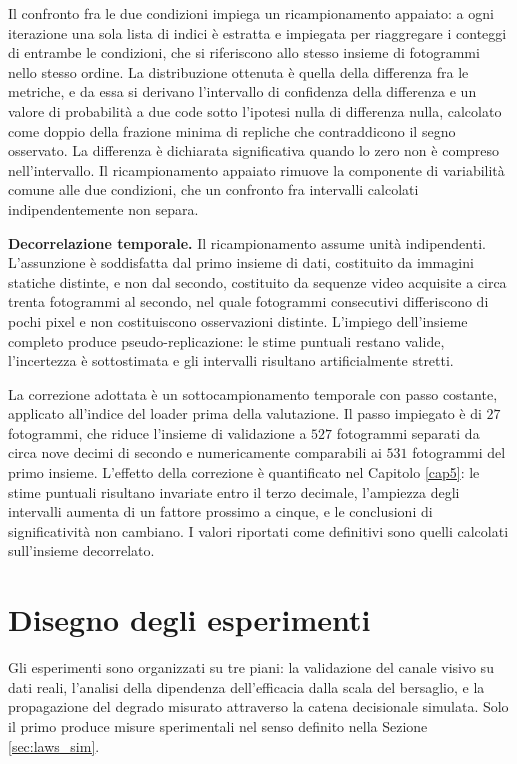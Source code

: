 \documentclass[a4paper,12pt]{report}
\begin{document}
Il confronto fra le due condizioni impiega un ricampionamento appaiato: a ogni
iterazione una sola lista di indici è estratta e impiegata per riaggregare i
conteggi di entrambe le condizioni, che si riferiscono allo stesso insieme di
fotogrammi nello stesso ordine. La distribuzione ottenuta è quella della
differenza fra le metriche, e da essa si derivano l'intervallo di confidenza
della differenza e un valore di probabilità a due code sotto l'ipotesi nulla di
differenza nulla, calcolato come doppio della frazione minima di repliche che
contraddicono il segno osservato. La differenza è dichiarata significativa
quando lo zero non è compreso nell'intervallo. Il ricampionamento appaiato
rimuove la componente di variabilità comune alle due condizioni, che un
confronto fra intervalli calcolati indipendentemente non separa.

\textbf{Decorrelazione temporale.}
\label{sec:decorrelazione}
Il ricampionamento assume unità indipendenti. L'assunzione è soddisfatta dal
primo insieme di dati, costituito da immagini statiche distinte, e non dal
secondo, costituito da sequenze video acquisite a circa trenta fotogrammi al
secondo, nel quale fotogrammi consecutivi differiscono di pochi pixel e non
costituiscono osservazioni distinte. L'impiego dell'insieme completo produce
pseudo-replicazione: le stime puntuali restano valide, l'incertezza è
sottostimata e gli intervalli risultano artificialmente stretti.

La correzione adottata è un sottocampionamento temporale con passo costante,
applicato all'indice del loader prima della valutazione. Il passo impiegato è di
$27$ fotogrammi, che riduce l'insieme di validazione a $527$ fotogrammi separati
da circa nove decimi di secondo e numericamente comparabili ai $531$ fotogrammi
del primo insieme. L'effetto della correzione è quantificato nel Capitolo
\ref{cap5}: le stime puntuali risultano invariate entro il terzo decimale,
l'ampiezza degli intervalli aumenta di un fattore prossimo a cinque, e le
conclusioni di significatività non cambiano. I valori riportati come definitivi
sono quelli calcolati sull'insieme decorrelato.

\section{Disegno degli esperimenti}
\label{sec:esperimenti}

Gli esperimenti sono organizzati su tre piani: la validazione del canale visivo
su dati reali, l'analisi della dipendenza dell'efficacia dalla scala del
bersaglio, e la propagazione del degrado misurato attraverso la catena
decisionale simulata. Solo il primo produce misure sperimentali nel senso
definito nella Sezione \ref{sec:laws_sim}.
\end{document}
